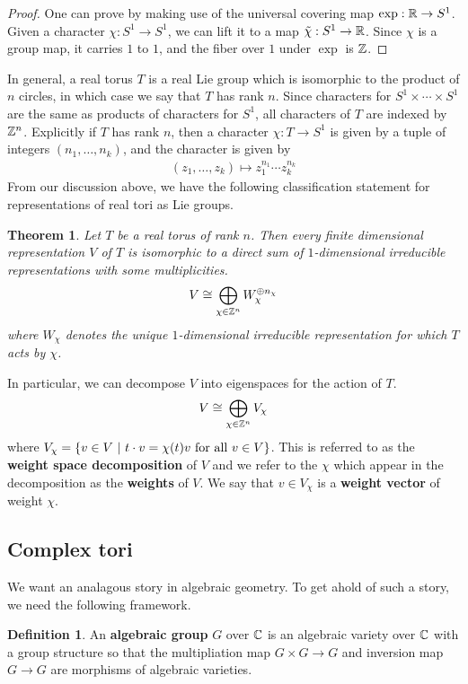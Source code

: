 \documentclass{amsart}
\numberwithin{equation}{section}
\theoremstyle{plain} %
\newtheorem{theorem}[equation]{Theorem}
\theoremstyle{definition}
\newtheorem{definition}[equation]{Definition}
\theoremstyle{remark}
\begin{document}
\begin{proof}
    One can prove by making use of the universal covering map $\exp: \mathbb{R}\to S^1$.
    Given a character $\chi: S^1\to S^1$, we can lift it to a map $\tilde \chi: S^1\to \mathbb{R}$.
    Since $\chi$ is a group map, it carries $1$ to $1$, and the fiber over $1$ under $\exp$ is $\mathbb{Z}$.
\end{proof}

In general, a real torus $T$ is a real Lie group which is isomorphic to the product of $n$ circles, 
in which case we say that $T$ has rank $n$. Since characters for $S^1\times\cdots\times S^1$ are the same as products of characters for $S^1$, 
all characters of $T$ are indexed by $\mathbb{Z}^n$. Explicitly if $T$ has rank $n$, then a character $\chi: T\to S^1$ is given by a tuple of integers $(n_1,\ldots, n_k)$, and the character is given by
\begin{align*}
    (z_1,\ldots, z_k)\mapsto z_1^{n_1}\cdots z_k^{n_k}
\end{align*}
From our discussion above, we have the following classification statement for representations of real tori as Lie groups.

\begin{theorem}
    Let $T$ be a real torus of rank $n$. Then every finite dimensional representation $V$ of $T$ is isomorphic 
    to a direct sum of $1$-dimensional irreducible representations with some multiplicities.
    \begin{align*}
        V \cong \bigoplus_{\chi\in \mathbb{Z}^n} W_\chi^{\oplus n_\chi}
    \end{align*} where $W_\chi$ denotes the unique $1$-dimensional irreducible representation for which $T$ acts by $\chi$.
\end{theorem}

In particular, we can decompose $V$ into eigenspaces for the action of $T$. \begin{align*}
    V \cong \bigoplus_{\chi\in\mathbb{Z}^n} V_\chi
\end{align*} where $V_\chi = \{v\in V \ \vert \  t\cdot v = \chi(t)v \text{ for all $v\in V$}\}$. This is
referred to as the \textbf{weight space decomposition} of $V$ and we refer to the $\chi$ which appear in 
the decomposition as the \textbf{weights} of $V$. 
We say that $v\in V_\chi$ is a \textbf{weight vector} of weight $\chi$.


\subsection{Complex tori}
We want an analagous story in algebraic geometry. To get ahold of such a story, 
we need the following framework.
\begin{definition}
    An \textbf{algebraic group} $G$ over $\mathbb{C}$ is an algebraic variety over $\mathbb{C}$ with a group structure
    so that the multipliation map $G\times G\to G$ and inversion map $G\to G$ are morphisms
    of algebraic varieties.
\end{definition}
\end{document}
